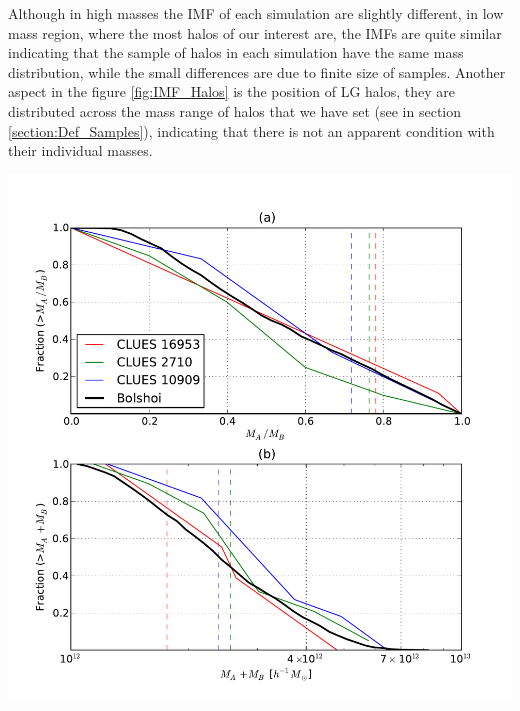 \documentclass[usenatbib]{mn2e}
\begin{document}
Although in high masses the IMF of each simulation are slightly different, 
in low mass region, where the most halos of our interest are, the IMFs are 
quite similar indicating that the sample of halos in each simulation have 
the same mass distribution, while the small differences are due to finite 
size of samples. Another aspect in the figure \ref{fig:IMF_Halos} is the 
position of LG halos, they are distributed across the mass range of halos 
that we have set (see in section \ref{section:Def_Samples}), indicating 
that there is not an apparent condition with their individual masses.


\begin{flushleft}
\begin{center}

\includegraphics[keepaspectratio=true,width=0.35\textheight]
{./figures/Pairs_IPMF.pdf}


\label{fig:Index_Pairs}
\vspace{0.1 cm}
\end{center}
\end{flushleft}
\end{document}
